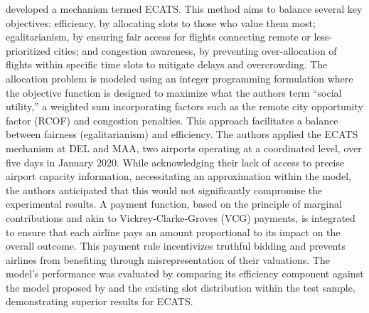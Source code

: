  developed a mechanism termed \acrfull{ECATS}. This method aims to balance several key objectives: efficiency, by allocating slots to those who value them most; egalitarianism, by ensuring fair access for flights connecting remote or less-prioritized cities; and congestion awareness, by preventing over-allocation of flights within specific time slots to mitigate delays and overcrowding. The allocation problem is modeled using an integer programming formulation where the objective function is designed to maximize what the authors term “social utility,” a weighted sum incorporating factors such as the remote city opportunity factor (RCOF) and congestion penalties. This approach facilitates a balance between fairness (egalitarianism) and efficiency. The authors applied the ECATS mechanism at \acrlong{DEL} and \acrlong{MAA}, two airports operating at a coordinated level, over five days in January 2020. While acknowledging their lack of access to precise airport capacity information, necessitating an approximation within the model, the authors anticipated that this would not significantly compromise the experimental results. A payment function, based on the principle of marginal contributions and akin to Vickrey-Clarke-Groves (VCG) payments, is integrated to ensure that each airline pays an amount proportional to its impact on the overall outcome. This payment rule incentivizes truthful bidding and prevents airlines from benefiting through misrepresentation of their valuations. The model's performance was evaluated by comparing its efficiency component against the model proposed by  and the existing slot distribution within the test sample, demonstrating superior results for \acrfull{ECATS}.

